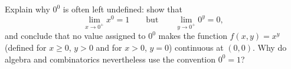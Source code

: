 Explain why $0^0$ is often left undefined: show that
\[
\lim_{x\to0^+}x^0=1\qquad\text{but}\qquad\lim_{y\to0^+}0^y=0,
\]
and conclude that no value assigned to $0^0$ makes the function $f(x,y)=x^y$ (defined for $x\ge0$, $y>0$ and for $x>0$, $y=0$) continuous at $(0,0)$. Why do algebra and combinatorics nevertheless use the convention $0^0=1$?
